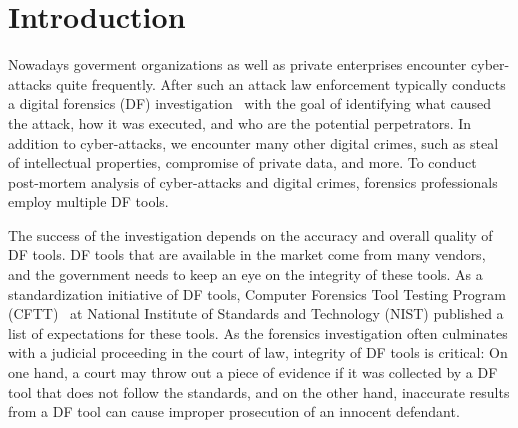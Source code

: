 \section{Introduction}\label{intro}


Nowadays goverment organizations as well as private enterprises encounter cyber-attacks quite frequently.
After such an attack law enforcement typically conducts a digital forensics (DF) investigation~\cite{df:news} \morecite 
with the goal of identifying what caused the attack, how it was executed, and who are the potential perpetrators. 
In addition to cyber-attacks, we encounter many other digital crimes, such as steal of intellectual properties, 
compromise of private data, and more. To conduct post-mortem analysis of cyber-attacks and digital crimes, forensics professionals
employ multiple DF tools. 

The success of the investigation depends on the accuracy and overall quality of DF tools.
DF tools that are available in the market come from many vendors, and the government needs to keep an eye on the integrity of these tools. 
As a standardization initiative of DF tools,  Computer Forensics Tool Testing Program (CFTT)~\cite{cftt:nist} 
at National Institute of Standards and Technology (NIST) published a list of expectations for these tools. 
As the forensics investigation often culminates with a judicial proceeding in the court of law, integrity of DF tools 
is critical: On one hand, a court may throw out a piece of evidence if it was collected by a DF tool that does not follow the standards, 
and on the other hand, inaccurate results from a DF tool can cause improper prosecution of an innocent defendant. 

